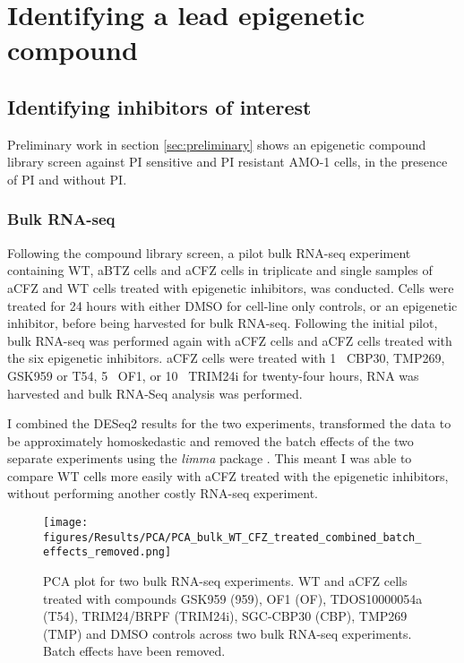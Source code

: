 \chapter{\label{ch:5-results_dose}Identifying a lead epigenetic compound}

\section{Identifying inhibitors of interest}
Preliminary work in section \ref{sec:preliminary} shows an epigenetic compound library screen against PI sensitive and PI resistant AMO-1 cells, in the presence of PI and without PI\@.

\subsection{Bulk RNA-seq}
Following the compound library screen, a pilot bulk RNA-seq experiment containing WT, aBTZ cells and aCFZ cells in triplicate and single samples of aCFZ and WT cells treated with epigenetic inhibitors, was conducted.
Cells were treated for 24 hours with either DMSO for cell-line only controls, or an epigenetic inhibitor, before being harvested for bulk RNA-seq.
Following the initial pilot, bulk RNA-seq was performed again with aCFZ cells and aCFZ cells treated with the six epigenetic inhibitors.
aCFZ cells were treated with 1\si{\micro\Molar} CBP30, TMP269, GSK959 or T54, 5\si{\micro\Molar} OF1, or 10\si{\micro\Molar} TRIM24i for twenty-four hours, RNA was harvested and bulk RNA-Seq analysis was performed.


I combined the DESeq2 \cite{love2014moderated} results for the two experiments, transformed the data to be approximately homoskedastic and removed the batch effects of the two separate experiments using the \textit{limma} package \cite{smyth2005limma}.
This meant I was able to compare WT cells more easily with aCFZ treated with the epigenetic inhibitors, without performing another costly RNA-seq experiment.

\begin{figure}[htb]
\centering
\texttt{[image: figures/Results/PCA/PCA\_bulk\_WT\_CFZ\_treated\_combined\_batch\_effects\_removed.png]}
\caption[Bulk RNA-Seq WT and aCFZ cells epigenetic treated PCA]{PCA plot for two bulk RNA-seq experiments.
WT and aCFZ cells treated with compounds GSK959 (959), OF1 (OF), TDOS10000054a (T54), TRIM24/BRPF (TRIM24i), SGC-CBP30 (CBP), TMP269 (TMP) and DMSO controls across two bulk RNA-seq experiments.
Batch effects have been removed.}
\label{fig:bulk_wt_cfz_epi_treated_pca}
\end{figure}

